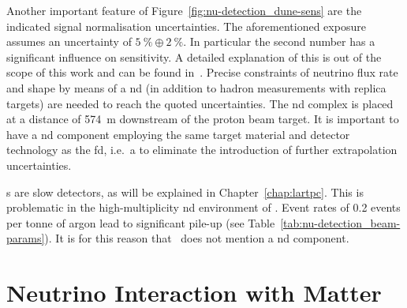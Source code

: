 Another important feature of Figure~\ref{fig:nu-detection_dune-sens} are the indicated signal normalisation uncertainties.
The aforementioned exposure assumes an uncertainty of $\SI{5}{\percent}\oplus\SI{2}{\percent}$.
In particular the second number has a significant influence on sensitivity.
A detailed explanation of this is out of the scope of this work and can be found in~\cite{dune2}.
Precise constraints of neutrino flux rate and shape by means of a \gls{nd} (in addition to hadron measurements with replica targets) are needed to reach the quoted uncertainties.
The \gls{nd} complex is placed at a distance of \SI{574}{\metre} downstream of the proton beam target.
It is important to have a \gls{nd} component employing the same target material and detector technology as the \gls{fd}, i.e.\ a \lartpc{} to eliminate the introduction of further extrapolation uncertainties.

\lartpc{}s are slow detectors, as will be explained in Chapter~\ref{chap:lartpc}.
This is problematic in the high-multiplicity \gls{nd} environment of \dune{}.
Event rates of \num{0.2} events per tonne of argon lead to significant pile-up (see Table~\ref{tab:nu-detection_beam-params}).
It is for this reason that~\cite{dune2} does not mention a \gls{nd} \lar{} component.


\section{Neutrino Interaction with Matter}
\label{sec:nu-detection_interactions}

